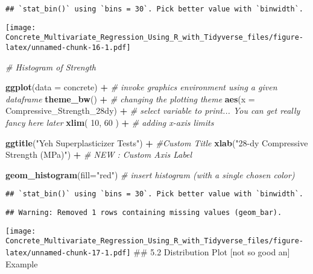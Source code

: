 \documentclass[]{article}
\newenvironment{Shaded}{\begin{snugshade}}{\end{snugshade}}
\newcommand{\CommentTok}[1]{\textcolor[rgb]{0.56,0.35,0.01}{\textit{#1}}}
\newcommand{\DataTypeTok}[1]{\textcolor[rgb]{0.13,0.29,0.53}{#1}}
\newcommand{\DecValTok}[1]{\textcolor[rgb]{0.00,0.00,0.81}{#1}}
\newcommand{\KeywordTok}[1]{\textcolor[rgb]{0.13,0.29,0.53}{\textbf{#1}}}
\newcommand{\NormalTok}[1]{#1}
\newcommand{\OperatorTok}[1]{\textcolor[rgb]{0.81,0.36,0.00}{\textbf{#1}}}
\newcommand{\StringTok}[1]{\textcolor[rgb]{0.31,0.60,0.02}{#1}}
\begin{document}
\begin{verbatim}
## `stat_bin()` using `bins = 30`. Pick better value with `binwidth`.
\end{verbatim}

\texttt{[image: Concrete\_Multivariate\_Regression\_Using\_R\_with\_Tidyverse\_files/figure-latex/unnamed-chunk-16-1.pdf]}

\begin{Shaded}
\begin{Highlighting}[]
\CommentTok{# Histogram of Strength}

\KeywordTok{ggplot}\NormalTok{(}\DataTypeTok{data =}\NormalTok{ concrete) }\OperatorTok{+}\StringTok{     }\CommentTok{# invoke graphics environment using a given dataframe}
\StringTok{  }
\StringTok{  }\KeywordTok{theme_bw}\NormalTok{() }\OperatorTok{+}\StringTok{                }\CommentTok{# changing the plotting theme}
\StringTok{  }
\StringTok{  }\KeywordTok{aes}\NormalTok{(}\DataTypeTok{x =}\NormalTok{ Compressive_Strength_28dy) }\OperatorTok{+}\StringTok{ }\CommentTok{# select variable to print... You can get really fancy here later}
\StringTok{  }
\StringTok{  }\KeywordTok{xlim}\NormalTok{( }\DecValTok{10}\NormalTok{, }\DecValTok{60}\NormalTok{ ) }\OperatorTok{+}\StringTok{          }\CommentTok{# adding x-axis limits}

\StringTok{  }\KeywordTok{ggtitle}\NormalTok{(}\StringTok{"Yeh Superplasticizer Tests"}\NormalTok{) }\OperatorTok{+}\StringTok{ }\CommentTok{#Custom Title}
\StringTok{  }
\StringTok{  }\KeywordTok{xlab}\NormalTok{(}\StringTok{"28-dy Compressive Strength (MPa)"}\NormalTok{) }\OperatorTok{+}\StringTok{ }\CommentTok{# NEW : Custom Axis Label}

\StringTok{  }\KeywordTok{geom_histogram}\NormalTok{(}\DataTypeTok{fill=}\StringTok{"red"}\NormalTok{) }\CommentTok{# insert histogram (with a single chosen color)}
\end{Highlighting}
\end{Shaded}

\begin{verbatim}
## `stat_bin()` using `bins = 30`. Pick better value with `binwidth`.
\end{verbatim}

\begin{verbatim}
## Warning: Removed 1 rows containing missing values (geom_bar).
\end{verbatim}

\texttt{[image: Concrete\_Multivariate\_Regression\_Using\_R\_with\_Tidyverse\_files/figure-latex/unnamed-chunk-17-1.pdf]}
\#\# 5.2 Distribution Plot {[}not so good an{]} Example
\end{document}
